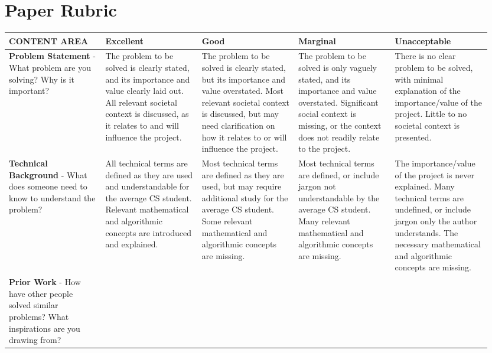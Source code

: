 \documentclass[10pt,twocolumn]{article}
\begin{document}
\section{Paper Rubric}
\begin{landscape}\small
\begin{longtable}{p{0.19\linewidth} | p{0.19\linewidth} | p{0.19\linewidth} | p{0.19\linewidth} | p{0.19\linewidth}}
\textbf{CONTENT AREA}
    & \textbf{Excellent}
    & \textbf{Good}
    & \textbf{Marginal}
    & \textbf{Unacceptable} \\
\toprule \endhead
\textbf{Problem Statement} - What problem are you solving? Why is it important?
    & \cellcolor{excellent} The problem to be solved is clearly stated, and its importance and value clearly laid out. All relevant societal context is discussed, as it relates to and will influence the project.
    & \cellcolor{good} The problem to be solved is clearly stated, but its importance and value overstated. Most relevant societal context is discussed, but may need clarification on how it relates to or will influence the project.
    & \cellcolor{marginal} The problem to be solved is only vaguely stated, and its importance and value overstated. Significant social context is missing, or the context does not readily relate to the project.
    & \cellcolor{unacceptable} There is no clear problem to be solved, with minimal explanation of the importance/value of the project. Little to no societal context is presented. \\
\midrule
\textbf{Technical Background} - What does someone need to know to understand the problem?
    & \cellcolor{excellent} All technical terms are defined as they are used and understandable for the average CS student. Relevant mathematical and algorithmic concepts are introduced and explained.
    & \cellcolor{good} Most technical terms are defined as they are used, but may require additional study for the average CS student. Some relevant mathematical and algorithmic concepts are missing.
    & \cellcolor{marginal} Most technical terms are defined, or include jargon not understandable by the average CS student. Many relevant mathematical and algorithmic concepts are missing.
    & \cellcolor{unacceptable} The importance/value of the project is never explained. Many technical terms are undefined, or include jargon only the author understands. The necessary mathematical and algorithmic concepts are missing. \\
\midrule
\textbf{Prior Work} - How have other people solved similar problems? What inspirations are you drawing from?

\end{longtable}
\end{landscape}
\end{document}
